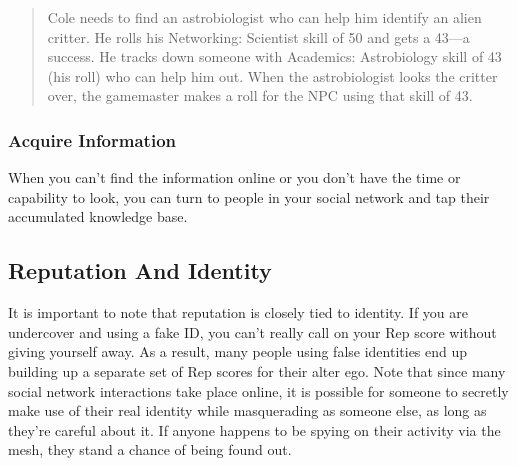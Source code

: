 \begin{quotation}
Cole needs to find an astrobiologist who can help
him identify an alien critter. He rolls his Networking:
Scientist skill of 50 and gets a 43—a success.
He tracks down someone with Academics: Astrobiology
skill of 43 (his roll) who can help him out.
When the astrobiologist looks the critter over, the
gamemaster makes a roll for the NPC using that
skill of 43.
\end{quotation}


\subsubsection{Acquire Information}

When you can't find the information online or you 
don't have the time or capability to look, you can 
turn to people in your social network and tap their 
accumulated knowledge base.

\subsection{Reputation And Identity}

It is important to note that reputation is closely tied 
to identity. If you are undercover and using a fake ID, 
you can't really call on your Rep score without giving 
yourself away. As a result, many people using false 
identities end up building up a separate set of Rep 
scores for their alter ego.
Note that since many social network interactions 
take place online, it is possible for someone to secretly 
make use of their real identity while masquerading 
as someone else, as long as they're careful about it. If 
anyone happens to be spying on their activity via the 
mesh, they stand a chance of being found out.


